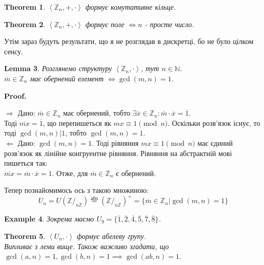 \documentclass[a4paper, 14pt]{extarticle}
\makeatletter
\theoremstyle{theoremdd}
\newtheorem{theorem}{Theorem}[subsection]
\theoremstyle{theoremdd}
\theoremstyle{theoremdd}
\theoremstyle{theoremdd}
\newtheorem{example}[theorem]{Example}
\theoremstyle{theoremdd}
\theoremstyle{theoremdd}
\theoremstyle{theoremdd}
\newtheorem{lemma}[theorem]{Lemma}
\theoremstyle{theoremdd}
\def\qed{$\blacksquare$}
\def\rightproof{$\boxed{\Rightarrow}$ }
\def\leftproof{$\boxed{\Leftarrow}$ }
\renewenvironment{proof}[1][Proof.\\]{\par
\pushQED{\hfill \qed}%
\normalfont \topsep6\p@\@plus6\p@\relax
\trivlist
\item\relax
{\bfseries
#1\@addpunct{.}}\hspace\labelsep\ignorespaces
}{%
\popQED\endtrivlist\@endpefalse
}
\makeatother
\begin{document}
\begin{theorem}
$\left< \mathbb{Z}_n, +, \cdot \right>$ формує комутативне кільце.
\end{theorem}

\begin{theorem}
$\left< \mathbb{Z}_n, +, \cdot \right>$ формує поле $\iff n$ - просте число.
\end{theorem}

Утім зараз будуть результати, що я не розглядав в дискретці, бо не було цілком сенсу.
\begin{lemma}
Розглянемо структуру $\left< \mathbb{Z}_n, \cdot \right>$, тут $n \in \mathbb{N}$.\\
$\overline{m} \in \mathbb{Z}_n$ має обернений елемент $\iff \gcd(m,n) = 1$.
\end{lemma}

\begin{proof}
\rightproof Дано: $\overline{m} \in \mathbb{Z}_n$ має обернений, тобто $\exists \overline{x} \in \mathbb{Z}_n: \overline{m} \cdot \overline{x} = \overline{1}$.\\
Тоді $\overline{mx} = \overline{1}$, що перепишеться як $mx \equiv 1 \pmod n$. Оскільки розв'язок існує, то тоді $\gcd(m,n) | 1$, тобто $\gcd(m,n) = 1$.
\bigskip \\
\leftproof Дано: $\gcd(m,n) = 1$. Тоді рівняння $mx \equiv 1 \pmod n$ має єдиний розв'язок як лінійне конгруентне рівняння. Рівняння на абстрактній мові пишеться так:\\
$\overline{mx} = \overline{m} \cdot \overline{x} = 1$. Отже, для $\overline{m} \in \mathbb{Z}_n$ є обернений.
\end{proof}

Тепер познайомимось ось з такою множиною:
$$ U_n = U(\mathbb{Z}/_{n \mathbb{Z}}) \overset{\text{або}}{=} (\mathbb{Z}/_{n\mathbb{Z}})^\times = \{\overline{m} \in \mathbb{Z}_n | \gcd(m,n) = 1\} $$
\begin{example}
Зокрема маємо $U_9 = \{\overline{1}, \overline{2}, \overline{4}, \overline{5}, \overline{7}, \overline{8} \}$.
\end{example}

\begin{theorem}
$\left< U_n, \cdot \right>$ формує абелеву групу.\\
\textit{Випливає з леми вище. Також важливо згадати, що \\
$\gcd(a,n) = 1, \gcd(b,n)= 1 \implies \gcd(ab,n) = 1$.}
\end{theorem}
\end{document}
